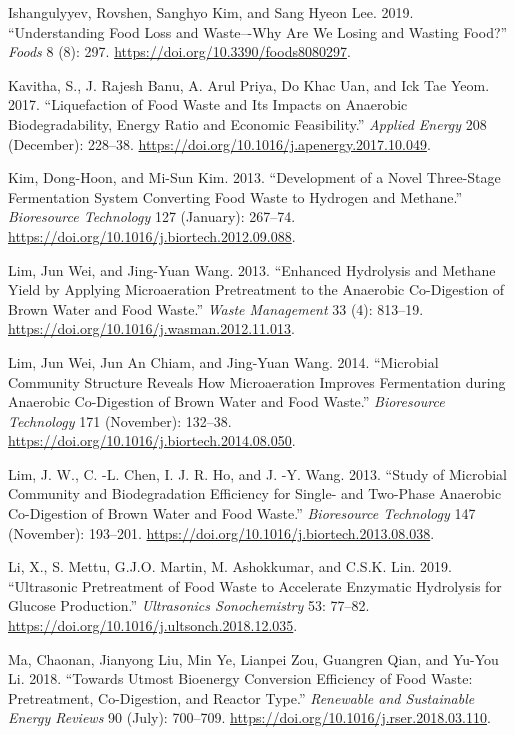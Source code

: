 \documentclass[11pt]{report}
\begin{document}
\begin{hangparas}{1.5em}{1}
\hypertarget{citeproc_bib_item_14}{Ishangulyyev, Rovshen, Sanghyo Kim, and Sang Hyeon Lee. 2019. “Understanding Food Loss and Waste–-Why Are We Losing and Wasting Food?” \textit{Foods} 8 (8): 297. \url{https://doi.org/10.3390/foods8080297}.}

\hypertarget{citeproc_bib_item_15}{Kavitha, S., J. Rajesh Banu, A. Arul Priya, Do Khac Uan, and Ick Tae Yeom. 2017. “Liquefaction of Food Waste and Its Impacts on Anaerobic Biodegradability, Energy Ratio and Economic Feasibility.” \textit{Applied Energy} 208 (December): 228–38. \url{https://doi.org/10.1016/j.apenergy.2017.10.049}.}

\hypertarget{citeproc_bib_item_16}{Kim, Dong-Hoon, and Mi-Sun Kim. 2013. “Development of a Novel Three-Stage Fermentation System Converting Food Waste to Hydrogen and Methane.” \textit{Bioresource Technology} 127 (January): 267–74. \url{https://doi.org/10.1016/j.biortech.2012.09.088}.}

\hypertarget{citeproc_bib_item_17}{Lim, Jun Wei, and Jing-Yuan Wang. 2013. “Enhanced Hydrolysis and Methane Yield by Applying Microaeration Pretreatment to the Anaerobic Co-Digestion of Brown Water and Food Waste.” \textit{Waste Management} 33 (4): 813–19. \url{https://doi.org/10.1016/j.wasman.2012.11.013}.}

\hypertarget{citeproc_bib_item_18}{Lim, Jun Wei, Jun An Chiam, and Jing-Yuan Wang. 2014. “Microbial Community Structure Reveals How Microaeration Improves Fermentation during Anaerobic Co-Digestion of Brown Water and Food Waste.” \textit{Bioresource Technology} 171 (November): 132–38. \url{https://doi.org/10.1016/j.biortech.2014.08.050}.}

\hypertarget{citeproc_bib_item_19}{Lim, J. W., C. -L. Chen, I. J. R. Ho, and J. -Y. Wang. 2013. “Study of Microbial Community and Biodegradation Efficiency for Single- and Two-Phase Anaerobic Co-Digestion of Brown Water and Food Waste.” \textit{Bioresource Technology} 147 (November): 193–201. \url{https://doi.org/10.1016/j.biortech.2013.08.038}.}

\hypertarget{citeproc_bib_item_20}{Li, X., S. Mettu, G.J.O. Martin, M. Ashokkumar, and C.S.K. Lin. 2019. “Ultrasonic Pretreatment of Food Waste to Accelerate Enzymatic Hydrolysis for Glucose Production.” \textit{Ultrasonics Sonochemistry} 53: 77–82. \url{https://doi.org/10.1016/j.ultsonch.2018.12.035}.}

\hypertarget{citeproc_bib_item_21}{Ma, Chaonan, Jianyong Liu, Min Ye, Lianpei Zou, Guangren Qian, and Yu-You Li. 2018. “Towards Utmost Bioenergy Conversion Efficiency of Food Waste: Pretreatment, Co-Digestion, and Reactor Type.” \textit{Renewable and Sustainable Energy Reviews} 90 (July): 700–709. \url{https://doi.org/10.1016/j.rser.2018.03.110}.}


\end{hangparas}
\end{document}
